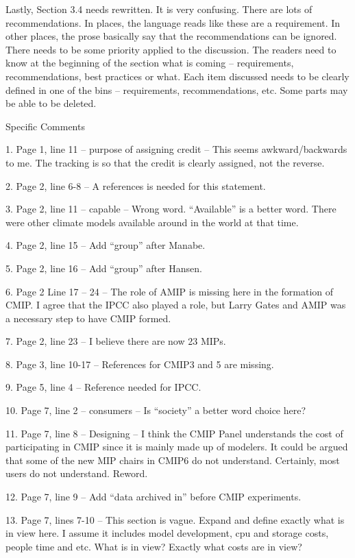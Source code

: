 \documentclass[gmd,manuscript]{copernicus}
\begin{document}
Lastly, Section 3.4 needs rewritten. It is very confusing. There are
lots of recommendations. In places, the language reads like these are
a requirement. In other places, the prose basically say that the
recommendations can be ignored. There needs to be some priority
applied to the discussion. The readers need to know at the beginning
of the section what is coming – requirements, recommendations, best
practices or what. Each item discussed needs to be clearly defined in
one of the bins – requirements, recommendations, etc. Some parts may
be able to be deleted.

Specific Comments

1. Page 1, line 11 – purpose of assigning credit – This seems
awkward/backwards to me. The tracking is so that the credit is clearly
assigned, not the reverse.

2. Page 2, line 6-8 – A references is needed for this statement.

3. Page 2, line 11 – capable – Wrong word. “Available” is a better
word. There were other climate models available around in the world at
that time.

4. Page 2, line 15 – Add “group” after Manabe.

5. Page 2, line 16 – Add “group” after Hansen.

6. Page 2 Line 17 – 24 – The role of AMIP is missing here in the
formation of CMIP. I agree that the IPCC also played a role, but Larry
Gates and AMIP was a necessary step to have CMIP formed.

7. Page 2, line 23 – I believe there are now 23 MIPs.

8. Page 3, line 10-17 – References for CMIP3 and 5 are missing.

9. Page 5, line 4 – Reference needed for IPCC.

10. Page 7, line 2 – consumers – Is “society” a better word choice
here?

11. Page 7, line 8 – Designing – I think the CMIP Panel understands
the cost of participating in CMIP since it is mainly made up of
modelers. It could be argued that some of the new MIP chairs in CMIP6
do not understand. Certainly, most users do not understand. Reword.

12. Page 7, line 9 – Add “data archived in” before CMIP experiments.

13. Page 7, lines 7-10 – This section is vague. Expand and define
exactly what is in view here. I assume it includes model development,
cpu and storage costs, people time and etc. What is in view? Exactly
what costs are in view?
\end{document}
